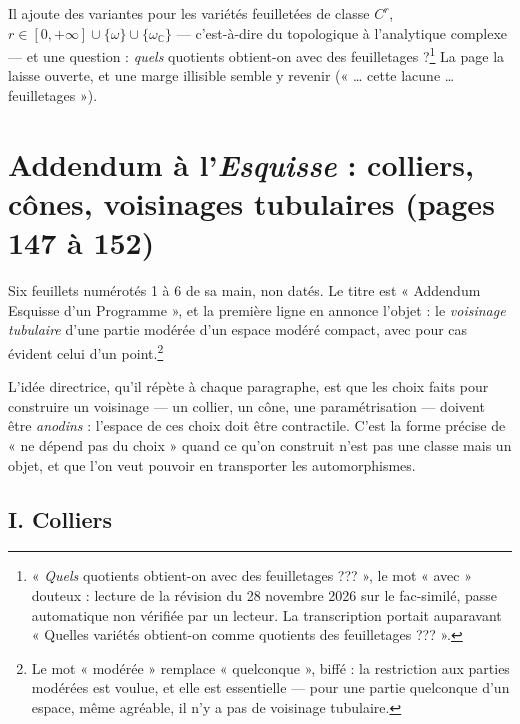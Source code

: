 \documentclass[11pt,a4paper]{article}
\begin{document}
Il ajoute des variantes pour les variétés feuilletées de classe $C^{r}$,
$r \in [0, +\infty] \cup \{\omega\} \cup \{\omega_{\mathbb{C}}\}$ —
c'est-à-dire du topologique à l'analytique complexe — et une question :
\emph{quels} quotients obtient-on avec des feuilletages ?\footnote{« \emph{Quels}
quotients obtient-on avec des feuilletages ??? », le mot « avec » douteux :
lecture de la révision du 28 novembre 2026 sur le fac-similé, passe
automatique non vérifiée par un lecteur. La transcription portait auparavant
« Quelles variétés obtient-on comme quotients des feuilletages ??? ».} La page la laisse ouverte, et une marge
illisible semble y revenir (« \ldots{} cette lacune \ldots{} feuilletages »).

\section*{Addendum à l'\emph{Esquisse} : colliers, cônes, voisinages tubulaires (pages 147 à 152)}

Six feuillets numérotés 1 à 6 de sa main, non datés. Le titre est
« Addendum Esquisse d'un Programme », et la première ligne en annonce
l'objet : le \emph{voisinage tubulaire} d'une partie modérée d'un espace
modéré compact, avec pour cas évident celui d'un point.\footnote{Le mot
« modérée » remplace « quelconque », biffé : la restriction aux parties
modérées est voulue, et elle est essentielle — pour une partie quelconque
d'un espace, même agréable, il n'y a pas de voisinage tubulaire.}

L'idée directrice, qu'il répète à chaque paragraphe, est que les choix faits
pour construire un voisinage — un collier, un cône, une paramétrisation —
doivent être \emph{anodins} : l'espace de ces choix doit être contractile.
C'est la forme précise de « ne dépend pas du choix » quand ce qu'on construit
n'est pas une classe mais un objet, et que l'on veut pouvoir en transporter
les automorphismes.

\subsection*{I. Colliers}
\end{document}
